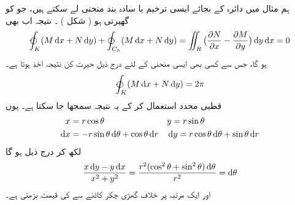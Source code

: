   ہم مثال    میں دائرہ  کے بجائے     ایسی ترخیم  یا  سادہ بند منحنی    لے سکتے ہیں، جو   کو   گھیرتی ہو ( شکل    ) ۔ نتیجہ اب بھی 
\begin{align*}
\varointctrclockwise_K ( M \dif x + N \dif y ) + \varointclockwise_{C_h} ( M \dif x + N \dif y) = \iint_R \big(\frac{\partial N}{\partial x} - \frac{\partial M}{\partial y}\big) \dif y \dif x = 0 
\end{align*}
ہو گا،  جس سے کسی بھی  ایسی منحنی    کے لئے درج ذیل حیرت  کن نتیجہ اخذ ہوتا ہے۔ 
\begin{align*}
\varointctrclockwise_K ( M \dif x + N \dif y ) = 2 \pi 
\end{align*}
 قطبی محدد  استعمال کر کے یہ نتیجہ سمجھا جا سکتا ہے۔   یوں  
\begin{align*}
  x& = r\cos{\theta} && y = r\sin{\theta}\\   
 \dif x &= -r \sin{\theta} \dif \theta + \cos{\theta} \dif r  &&  \dif y = r \cos{\theta} \dif \theta + \sin{\theta} \dif r 
\end{align*}
 لکھ کر درج ذیل ہو گا
\begin{align}
  \frac{x \dif y - y\dif x}{x^2 + y^2} = \frac{r^2( \cos^2{\theta} + \sin^2{\theta}) \dif \theta}{r^2} = \dif \theta    
\end{align}
 اور ایک مرتبہ   پر خلاف گھڑی  چکر کاٹنے سے    کی قیمت   بڑھتی ہے۔
 
